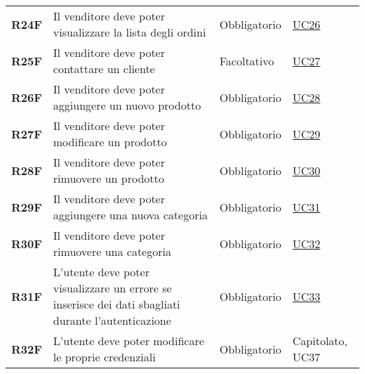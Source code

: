 \begin{center}
\begin{longtable}[!h]{p{50px} p{245px} p{75px} p{50px}}
        \textbf{R24F}                         & Il venditore deve poter visualizzare la lista degli ordini                                                                                          & Obbligatorio             & \hyperref[sec:UC26]{UC26}                      \\
        \textbf{R25F}                         & Il venditore deve poter contattare un cliente                                                                                                       & Facoltativo              & \hyperref[sec:UC27]{UC27}                      \\
        \textbf{R26F}                         & Il venditore deve poter aggiungere un nuovo prodotto                                                                                                & Obbligatorio             & \hyperref[sec:UC28]{UC28}                      \\
        \textbf{R27F}                         & Il venditore deve poter modificare un prodotto                                                                                                      & Obbligatorio             & \hyperref[sec:UC29]{UC29}                      \\
        \textbf{R28F}                         & Il venditore deve poter rimuovere un prodotto                                                                                                       & Obbligatorio             & \hyperref[sec:UC30]{UC30}                      \\
        \textbf{R29F}                         & Il venditore deve poter aggiungere una nuova categoria                                                                                              & Obbligatorio             & \hyperref[sec:UC31]{UC31}                      \\
        \textbf{R30F}                         & Il venditore deve poter rimuovere una categoria                                                                                                     & Obbligatorio             & \hyperref[sec:UC32]{UC32}                      \\
        \textbf{R31F}                         & L'utente deve poter visualizzare un errore se inserisce dei dati sbagliati durante l'autenticazione                                                 & Obbligatorio             & \hyperref[sec:UC33]{UC33}                      \\
        \textbf{R32F}                         & L'utente deve poter modificare le proprie credenziali                                                                                               & Obbligatorio             & Capitolato, UC37                               \\

\end{longtable}
\end{center}
